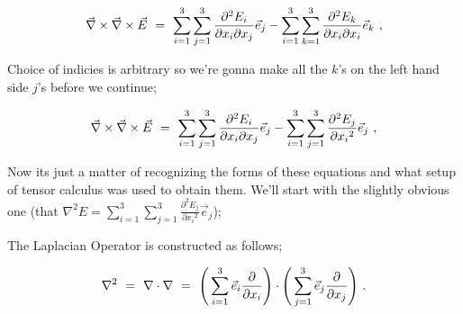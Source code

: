 \documentclass{article}
\begin{document}
\begin{equation} \label{eq:51}
\vec{\nabla}\times\vec{\nabla}\times\vec{E} \hspace{0.125cm} = \hspace{0.125cm} \sum_{i=1}^{3} \sum_{j=1}^{3} \frac{\partial^{2}{E_i}}{\partial{x_i}\partial{x_j}} \vec{e}_j - \sum_{i=1}^{3} \sum_{k=1}^{3} \frac{\partial^{2}{E_k}}{\partial{x_i}\partial{x_i}} \vec{e}_k \hspace{0.125cm} ,
\end{equation}

Choice of indicies is arbitrary so we're gonna make all the \begin{math} k \end{math}'s on the left hand side \begin{math} j \end{math}'s before we continue;

\begin{equation} \label{eq:51}
\vec{\nabla}\times\vec{\nabla}\times\vec{E} \hspace{0.125cm} = \hspace{0.125cm} \sum_{i=1}^{3} \sum_{j=1}^{3} \frac{\partial^{2}{E_i}}{\partial{x_i}\partial{x_j}} \vec{e}_j - \sum_{i=1}^{3} \sum_{j=1}^{3} \frac{\partial^{2}{E_j}}{\partial{x_i}^{2}} \vec{e}_j \hspace{0.125cm} ,
\end{equation}

Now its just a matter of recognizing the forms of these equations and what setup of tensor calculus was used to obtain them. We'll start with the slightly obvious one (that \begin{math} \nabla^{2} E = \sum_{i=1}^{3} \sum_{j=1}^{3} \frac{\partial^{2}{E_j}}{\partial{x_i}^{2}} \vec{e}_j \end{math});

The Laplacian Operator is constructed as follows;

\begin{equation} \label{eq:51}
\nabla^{2} \hspace{0.125cm} = \hspace{0.125cm} \nabla\cdot\nabla \hspace{0.125cm} = \hspace{0.125cm} \Bigg( \sum_{i=1}^{3} \vec{e}_i \frac{\partial}{\partial{x_i}} \Bigg)\cdot\Bigg( \sum_{j=1}^{3} \vec{e}_j \frac{\partial}{\partial{x_j}} \Bigg) \hspace{0.125cm} .
\end{equation}
\end{document}
